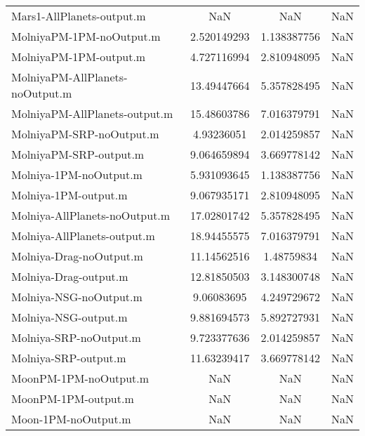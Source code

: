 \begin{table}[htbp!]
\begin{tabular}{lccc}
         Mars1-AllPlanets-output.m & NaN & NaN & NaN \\
         MolniyaPM-1PM-noOutput.m & 2.520149293 & 1.138387756 & NaN \\
         MolniyaPM-1PM-output.m & 4.727116994 & 2.810948095 & NaN \\
         MolniyaPM-AllPlanets-noOutput.m & 13.49447664 & 5.357828495 & NaN \\
         MolniyaPM-AllPlanets-output.m & 15.48603786 & 7.016379791 & NaN \\
         MolniyaPM-SRP-noOutput.m & 4.93236051 & 2.014259857 & NaN \\
         MolniyaPM-SRP-output.m & 9.064659894 & 3.669778142 & NaN \\
         Molniya-1PM-noOutput.m & 5.931093645 & 1.138387756 & NaN \\
         Molniya-1PM-output.m & 9.067935171 & 2.810948095 & NaN \\
         Molniya-AllPlanets-noOutput.m & 17.02801742 & 5.357828495 & NaN \\
         Molniya-AllPlanets-output.m & 18.94455575 & 7.016379791 & NaN \\
         Molniya-Drag-noOutput.m & 11.14562516 & 1.48759834 & NaN \\
         Molniya-Drag-output.m & 12.81850503 & 3.148300748 & NaN \\
         Molniya-NSG-noOutput.m & 9.06083695 & 4.249729672 & NaN \\
         Molniya-NSG-output.m & 9.881694573 & 5.892727931 & NaN \\
         Molniya-SRP-noOutput.m & 9.723377636 & 2.014259857 & NaN \\
         Molniya-SRP-output.m & 11.63239417 & 3.669778142 & NaN \\
         MoonPM-1PM-noOutput.m & NaN & NaN & NaN \\
         MoonPM-1PM-output.m & NaN & NaN & NaN \\
         Moon-1PM-noOutput.m & NaN & NaN & NaN \\

\end{tabular}
\end{table}
